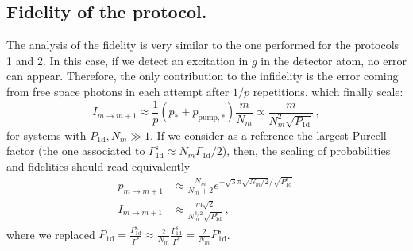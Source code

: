 \documentclass[twocolumn,pra,aps,superscriptaddress,showpacs]{revtex4-1}
\def\oned{\mathrm{1d}}
\newcommand{\rs}{\mathrm{s}}
\newcommand{\rg}{\mathrm{g}}
\begin{document}
\subsection{Fidelity of the protocol.}

The analysis of the fidelity is very similar to the one performed for the protocols 1 and 2. In this case, if we detect an excitation in $g$ in the detector atom, no error can appear. Therefore, the only contribution to the infidelity is the error coming from free space photons in each attempt after $1/p$ repetitions, which finally scale:
%
\begin{equation}
I_{m\rightarrow m+1}
	\approx \frac{1}{p} (p_{*}+p_{\mathrm{pump},*}) \frac{m}{N_m}
	\propto \frac{m}{N_m^2 \sqrt{P_\oned}}\,,
\end{equation}
%
for systems with $P_\oned,N_m\gg 1$. If we consider as a reference the largest Purcell factor (the one associated to $\Gamma_{\oned}^\rs \approx N_m \Gamma_\oned / 2$), then, the scaling of probabilities and fidelities should read equivalently
%
\begin{align}\label{eq:fidsinglestep}
p_{m \rightarrow m+1}
	&\approx \frac{N_m}{N_m+2} e^{-\sqrt{3}\pi \sqrt{N_m/2}/\sqrt{P_\oned^\rs}}\,\nonumber \\
I_{m\rightarrow m+1}
	&\approx \frac{m \sqrt{2}}{N_m^{3/2} \sqrt{P_\oned^\rs}}\,,
\end{align}
where we replaced 
$P_\oned =\frac{ \Gamma_\oned^\rg}{\Gamma^*} \approx \frac{2}{N_m} \frac{\Gamma_\oned^\rs}{\Gamma^*} = \frac{2}{N_m} P_\oned^\rs$.
\end{document}
